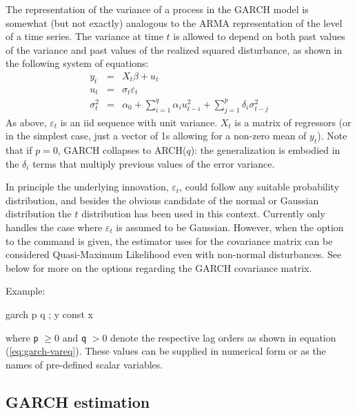 The representation of the variance of a process in the GARCH model is
somewhat (but not exactly) analogous to the ARMA representation of the
level of a time series.  The variance at time $t$ is allowed
to depend on both past values of the variance and past values of the
realized squared disturbance, as shown in the following system
of equations:
\begin{eqnarray}
  \label{eq:garch-meaneq}
  y_t &  = & X_t \beta + u_t \\
  \label{eq:garch-epseq}
  u_t &  = & \sigma_t \varepsilon_t \\
  \label{eq:garch-vareq}
  \sigma^2_t & = & \alpha_0 + \sum_{i=1}^q \alpha_i u^2_{t-i} +
	  \sum_{j=1}^p \delta_i \sigma^2_{t-j}
\end{eqnarray}
As above, $\varepsilon_t$ is an iid sequence with unit variance.
$X_t$ is a matrix of regressors (or in the simplest case,
just a vector of 1s allowing for a non-zero mean of $y_t$).  Note that
if $p=0$, GARCH collapses to ARCH($q$): the generalization is embodied
in the $\delta_i$ terms that multiply previous values of the error
variance.

In principle the underlying innovation, $\varepsilon_t$, could follow
any suitable probability distribution, and besides the obvious
candidate of the normal or Gaussian distribution the $t$ distribution
has been used in this context.  Currently  only handles the
case where $\varepsilon_t$ is assumed to be Gaussian.  However, when
the  option to the  command is given, the
estimator  uses for the covariance matrix can be considered
Quasi-Maximum Likelihood even with non-normal disturbances.  See below
for more on the options regarding the GARCH covariance matrix.

Example:
\begin{code}
garch p q ; y const x
\end{code}
where \verb|p| $\ge 0$ and \verb|q| $>0$ denote the respective lag
orders as shown in equation (\ref{eq:garch-vareq}).  These values
can be supplied in numerical form or as the names of pre-defined
scalar variables.

\subsection{GARCH estimation}
\label{subsec:garch-est}


